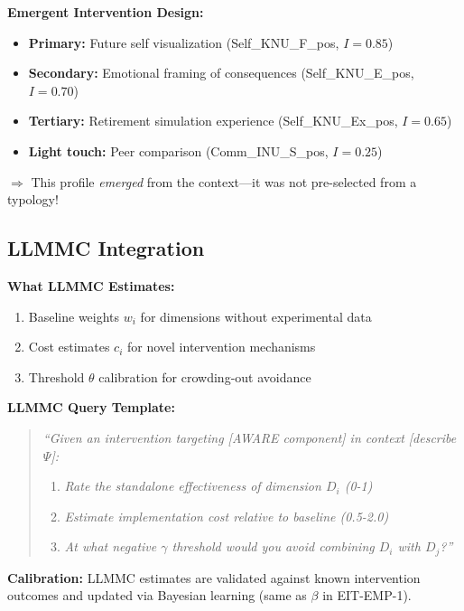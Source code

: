 \begin{tcolorbox}[colback=yellow!5!white, colframe=yellow!75!black,
    title=\textbf{Example: Retirement Savings Intervention}]
\textbf{Emergent Intervention Design:}
\begin{itemize}[nosep]
    \item \textbf{Primary:} Future self visualization (Self\_KNU\_F\_pos, $I = 0.85$)
    \item \textbf{Secondary:} Emotional framing of consequences (Self\_KNU\_E\_pos, $I = 0.70$)
    \item \textbf{Tertiary:} Retirement simulation experience (Self\_KNU\_Ex\_pos, $I = 0.65$)
    \item \textbf{Light touch:} Peer comparison (Comm\_INU\_S\_pos, $I = 0.25$)
\end{itemize}

$\Rightarrow$ This profile \textit{emerged} from the context—it was not pre-selected from a typology!

\end{tcolorbox}

\subsection{LLMMC Integration}
\label{subsec:emp2-llmmc}

\begin{tcolorbox}[colback=blue!5!white, colframe=blue!75!black,
    title=\textbf{Protocol EIT-EMP-2-P1: LLMMC for Algorithm Parameters}]

\textbf{What LLMMC Estimates:}
\begin{enumerate}[nosep]
    \item Baseline weights $w_i$ for dimensions without experimental data
    \item Cost estimates $c_i$ for novel intervention mechanisms
    \item Threshold $\theta$ calibration for crowding-out avoidance
\end{enumerate}

\textbf{LLMMC Query Template:}
\begin{quote}
\textit{``Given an intervention targeting [AWARE component] in context [describe $\Psi$]:}
\begin{enumerate}[nosep]
    \item \textit{Rate the standalone effectiveness of dimension $D_i$ (0-1)}
    \item \textit{Estimate implementation cost relative to baseline (0.5-2.0)}
    \item \textit{At what negative $\gamma$ threshold would you avoid combining $D_i$ with $D_j$?''}
\end{enumerate}
\end{quote}

\textbf{Calibration:} LLMMC estimates are validated against known intervention outcomes and updated via Bayesian learning (same as $\beta$ in EIT-EMP-1).

\end{tcolorbox}

